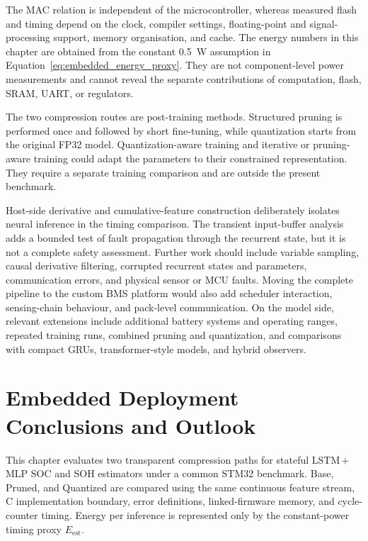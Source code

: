 \documentclass[
    a4paper,
    12pt,
    titlepage,
    bibliography=totoc,
    twoside=on,
    parskip=false,
    numbers=noenddot,
    cleardoublepage=empty,
    DIV=12,
    BCOR=12.0mm,
    headheight=36pt,
    headings=openright
]{scrreprt}
\begin{document}
The MAC relation is independent of the microcontroller, whereas measured flash and timing depend on the clock, compiler settings, floating-point and signal-processing support, memory organisation, and cache. The energy numbers in this chapter are obtained from the constant \SI{0.5}{\watt} assumption in Equation~\ref{eq:embedded_energy_proxy}. They are not component-level power measurements and cannot reveal the separate contributions of computation, flash, SRAM, UART, or regulators.

The two compression routes are post-training methods. Structured pruning is performed once and followed by short fine-tuning, while quantization starts from the original FP32 model. Quantization-aware training and iterative or pruning-aware training could adapt the parameters to their constrained representation.\autocite{krishnamoorthiQuantizingDeepConvolutional2018,wenLearningIntrinsicSparse2017} They require a separate training comparison and are outside the present benchmark.

Host-side derivative and cumulative-feature construction deliberately isolates neural inference in the timing comparison. The transient input-buffer analysis adds a bounded test of fault propagation through the recurrent state, but it is not a complete safety assessment. Further work should include variable sampling, causal derivative filtering, corrupted recurrent states and parameters, communication errors, and physical sensor or MCU faults. Moving the complete pipeline to the custom BMS platform would also add scheduler interaction, sensing-chain behaviour, and pack-level communication. On the model side, relevant extensions include additional battery systems and operating ranges, repeated training runs, combined pruning and quantization, and comparisons with compact GRUs, transformer-style models, and hybrid observers.\autocite{liptonCriticalReviewRecurrent2015,singhDeepMachineLearning2024,gaoEnhancedStateofchargeEstimation2022,wangFusionEstimationLithiumion2022}

\section{Embedded Deployment Conclusions and Outlook}
This chapter evaluates two transparent compression paths for stateful LSTM\,+\,MLP SOC and SOH estimators under a common STM32 benchmark. Base, Pruned, and Quantized are compared using the same continuous feature stream, C implementation boundary, error definitions, linked-firmware memory, and cycle-counter timing. Energy per inference is represented only by the constant-power timing proxy $E_{\mathrm{est}}$.
\end{document}
